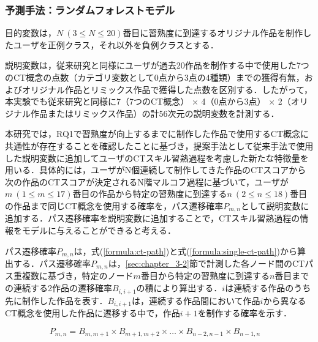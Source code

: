 \documentclass[submit]{ipsj}
\newcommand{\todo}[1]{\colorbox{yellow}{{\bf TODO}:}{\color{red} {\textbf{[#1]}}}}
\begin{document}

\subsubsection{予測手法：ランダムフォレストモデル}

目的変数は，{$N~(3 \leq N \leq 20)$}番目に習熟度\textcolor{red}{}に到達するオリジナル作品を制作したユーザを正例クラス，それ以外を負例クラスとする．

説明変数は，従来研究と同様にユーザが過去20作品を制作する中で使用した7つのCT概念の点数（カテゴリ変数として0点から3点の4種類）までの獲得有無，およびオリジナル作品とリミックス作品で獲得した点数を区別する\cite{Dasgupta_2016}．したがって，本実験でも従来研究と同様に7（7つのCT概念） $\times$ 4（0点から3点） $\times$ 2（オリジナル作品またはリミックス作品）の計56次元の説明変数を計測する．

本研究では，RQ1で習熟度が向上するまでに制作した作品で使用するCT概念に共通性が存在することを確認したことに基づき，提案手法として従来手法で使用した説明変数に追加してユーザのCTスキル習熟過程を考慮した新たな特徴量を用いる．具体的には，ユーザがN個連続して制作してきた作品のCTスコアから次の作品のCTスコアが決定されるN階マルコフ過程に基づいて，ユーザが$m~(1 \leq m \leq 17)$番目の作品から特定の習熟度に到達する$n~(2 \leq n \leq 18)$番目の作品まで同じCT概念を使用する確率を，パス遷移確率$P_{m,n}$として説明変数に追加する．パス遷移確率を説明変数に追加することで，CTスキル習熟過程の情報をモデルに与えることができると考える．

パス遷移確率$P_{m,n}$は，式(\ref{formula:ct-path})と式(\ref{formula:single-ct-path})から算出する．パス遷移確率$P_{m,n}$は，\ref{sec:chapter_3-2}節で計測した各ノード間のCTパス重複数に基づき，特定のノード$m$番目から特定の習熟度に到達する$n$番目までの連続する2作品の遷移確率$B_{i,i+1}$の積により算出する．$i$は連続する作品のうち先に制作した作品を表す．$B_{i,i+1}$は，連続する作品間において作品$i$から異なるCT概念を使用した作品に遷移する中で，作品$i+1$を制作する確率を示す．

\begin{equation}\label{formula:ct-path}
  P_{m,n} = B_{m,m+1} \times B_{m+1,m+2} \times \ldots \times B_{n-2,n-1} \times B_{n-1,n} \quad 
\end{equation}
\end{document}
